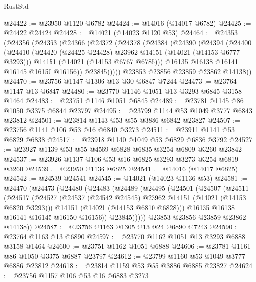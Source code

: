 \begin{lexlean}{RustStd}
\begin{coremodule}
@24422 := @23950 @1120 @6782
@24424 := @14016 (@14017 @6782)
@24425 := @24422 @24424
@24428 := @14021 (@14023 @1120 @53)
@24464 := @24353
    (@24356
      (@24363
        (@24366
          (@24372
            (@24378
              (@24384
                (@24390
                  (@24394
                    (@24400
                      (@24410
                        (@24420 (@24425 @24428) @23962 @14151 (@14021 (@14153 @6777 @3293)))
                        @14151
                        (@14021 (@14153 @6767 @6785)))
                      @16135
                      @16138
                      @16141
                      @16145
                      @16150
                      @16156))
                  @23845)))))
        @23853
        @23856
        @23859
        @23862
        @14138))
@24470 := @23756 @1147 @1306 @13 @30 @6847 @7244
@24473 := @23764 @1147 @13 @6847
@24480 := @23770 @1146 @1051 @13 @3293 @6845 @3158 @1464
@24483 := @23751 @1146 @1051 @6845
@24489 := @23781 @1145 @86 @1050 @3375 @6844 @23797
@24495 := @23799 @1144 @53 @1049 @3777 @6843 @23812
@24501 := @23814 @1143 @53 @55 @3886 @6842 @23827
@24507 := @23756 @1141 @106 @53 @16 @6840 @3273
@24511 := @23911 @1141 @53 @6829 @6838
@24517 := @23918 @1140 @1049 @53 @6829 @6836 @3792
@24527 := @23927 @1139 @53 @55 @4569 @6828 @6835 @3254 @6809 @3260 @23842
@24537 := @23926 @1137 @106 @53 @16 @6825 @3293 @3273 @3254 @6819 @3260
@24539 := @23950 @1136 @6825
@24541 := @14016 (@14017 @6825)
@24542 := @24539 @24541
@24545 := @14021 (@14023 @1136 @53)
@24581 := @24470
    (@24473
      (@24480
        (@24483
          (@24489
            (@24495
              (@24501
                (@24507
                  (@24511
                    (@24517
                      (@24527
                        (@24537 (@24542 @24545) @23962 @14151 (@14021 (@14153 @6820 @3293)))
                        @14151
                        (@14021 (@14153 @6810 @6828)))
                      @16135
                      @16138
                      @16141
                      @16145
                      @16150
                      @16156))
                  @23845)))))
        @23853
        @23856
        @23859
        @23862
        @14138))
@24587 := @23756 @1163 @1305 @13 @24 @6890 @7243
@24590 := @23764 @1163 @13 @6890
@24597 := @23770 @1162 @1051 @13 @3293 @6888 @3158 @1464
@24600 := @23751 @1162 @1051 @6888
@24606 := @23781 @1161 @86 @1050 @3375 @6887 @23797
@24612 := @23799 @1160 @53 @1049 @3777 @6886 @23812
@24618 := @23814 @1159 @53 @55 @3886 @6885 @23827
@24624 := @23756 @1157 @106 @53 @16 @6883 @3273

\end{coremodule}
\end{lexlean}
